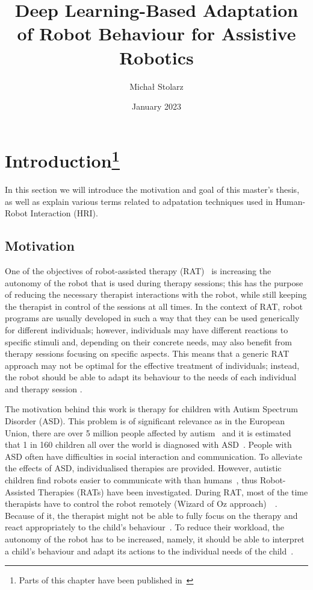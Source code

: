 \documentclass[thesis]{mas_proposal}
\title{Deep Learning-Based Adaptation of Robot Behaviour for Assistive Robotics}
\author{Michał Stolarz}
\date{January 2023}
\begin{document}
\maketitle

\pagestyle{plain}

\section[Introduction]{Introduction\footnote{Parts of this chapter have been published in~\cite{stolarz2022personalized,stolarz2022learningbased}}}
In this section we will introduce the motivation and goal of this master's thesis, as well as explain various terms related to adpatation techniques used in Human-Robot Interaction (HRI).
\subsection{Motivation}
One of the objectives of robot-assisted therapy (RAT)~\cite{esteban2017build} is increasing the autonomy of the robot that is used during therapy sessions; this has the purpose of reducing the necessary therapist interactions with the robot, while still keeping the therapist in control of the sessions at all times.
In the context of RAT, robot programs are usually developed in such a way that they can be used generically for different individuals; however, individuals may have different reactions to specific stimuli and, depending on their concrete needs, may also benefit from therapy sessions focusing on specific aspects.
This means that a generic RAT approach may not be optimal for the effective treatment of individuals; instead, the robot should be able to adapt its behaviour to the needs of each individual and therapy session \cite{esteban2017build,scassellati2018improving,rudovic2018personalized}.

The motivation behind this work is therapy for children with Autism Spectrum Disorder (ASD). 
This problem is of significant relevance as in the European Union, there are over 5 million people affected by autism~\cite{deenigma2022} and it is estimated that 1 in 160 children all over the world is diagnosed with ASD~\cite{jain2020modeling}. 
People with ASD often have difficulties in social interaction and communication. 
To alleviate the effects of ASD, individualised therapies are provided. 
However, autistic children find robots easier to communicate with than humans~\cite{robins2006}, thus Robot-Assisted Therapies (RATs) have been investigated. During RAT, most of the time therapists have to control the robot remotely (Wizard of Oz approach)~\cite{deenigma2022}~\cite{david2018developing,robins2017developing,rudovic2017measuring,marinoiu20183d}. 
Because of it, the therapist might not be able to fully focus on the therapy and react appropriately to the child's behaviour~\cite{cao2018personalized}. 
To reduce their workload, the autonomy of the robot has to be increased, namely, it should be able to interpret a child’s behaviour and adapt its actions to the individual needs of the child~\cite{esteban2017build}.
\end{document}
